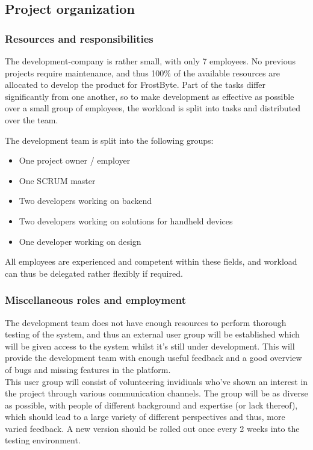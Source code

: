 \subsection{Project organization}
\subsubsection{Resources and responsibilities}
The development-company is rather small, with only 7 employees. No previous projects require maintenance, and thus 100\% of the available resources are allocated to develop the product for FrostByte.
Part of the tasks differ significantly from one another, so to make development as effective as possible over a small group of employees, the workload is split into tasks and distributed over the team.


The development team is split into the following groups:\\
\begin{itemize}
\item One project owner / employer\\
\item One SCRUM master\\
\item Two developers working on backend\\
\item Two developers working on solutions for handheld devices\\
\item One developer working on design
\end{itemize}

All employees are experienced and competent within these fields, and workload can thus be delegated rather flexibly if required.

\subsubsection{Miscellaneous roles and employment}

The development team does not have enough resources to perform thorough testing of the system, and thus an external user group will be established which will be given access to the system whilst it’s still under development. This will provide the development team with enough useful feedback and a good overview of bugs and missing features in the platform.\\
This user group will consist of volunteering invidiuals who’ve shown an interest in the project through various communication channels. The group will be as diverse as possible, with people of different background and expertise (or lack thereof), which should lead to a large variety of different perspectives and thus, more varied feedback.
A new version should be rolled out once every 2 weeks into the testing environment.

